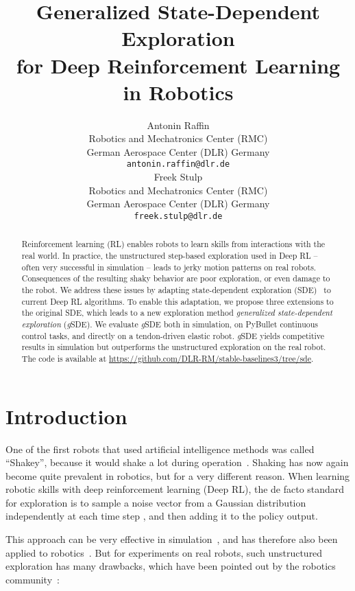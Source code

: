 \documentclass{article}
\title{\LARGE \textbf{Generalized State-Dependent Exploration\\for Deep Reinforcement Learning in Robotics}}
\author{
  Antonin Raffin\\
  Robotics and Mechatronics Center (RMC)\\
  German Aerospace Center (DLR)
  Germany\\
  \texttt{antonin.raffin@dlr.de} \\
  \And
  Freek Stulp\\
  Robotics and Mechatronics Center (RMC)\\
  German Aerospace Center (DLR)
  Germany\\
  \texttt{freek.stulp@dlr.de} \\
}
\newcommand{\ourSDE}{\textit{g}\textsc{SDE}\xspace}
\begin{document}
\maketitle


\begin{abstract}

Reinforcement learning (RL) enables robots to learn skills from interactions with the real world.
In practice, the unstructured step-based exploration used in Deep RL -- often very successful in simulation -- leads to jerky motion patterns on real robots. Consequences of the resulting shaky behavior are poor exploration, or even damage to the robot.
We address these issues by adapting state-dependent exploration (SDE)~\cite{ruckstiess2008state} to current Deep RL algorithms. To enable this adaptation, we propose three extensions to the original SDE, which leads to a new exploration method \textit{generalized state-dependent exploration} (\ourSDE).
We evaluate \ourSDE both in simulation, on PyBullet continuous control tasks, and directly on a tendon-driven elastic robot. \ourSDE yields competitive results in simulation but outperforms the unstructured exploration on the real robot.
The code is available at \url{https://github.com/DLR-RM/stable-baselines3/tree/sde}.

\end{abstract}

\section{Introduction}
\label{sec:intro}

One of the first robots that used artificial intelligence methods was called ``Shakey'', because it would shake a lot during operation~\cite{nilsson84shakey}.
Shaking has now again become quite prevalent in robotics, but for a very different reason. When learning robotic skills with deep reinforcement learning (Deep RL), the de facto standard for exploration is to sample a noise vector  from a Gaussian distribution independently at each time step , and then adding it to the policy output.



This approach can be very effective
in simulation~\citep{duan2016benchmarking,peng2018deepmimic, andrychowicz2018learning, fujimoto2018addressing, hwangbo2019learning}, and has therefore also been applied to robotics~\citep{haarnoja2018applications, kendall2019learning, zhu2020ingredients}.
But for experiments on real robots, such unstructured exploration has many drawbacks, which have been pointed out by the robotics community~\citep{ruckstiess2008state, kober2009policy, ruckstiess2010exploring, stulp2013robot, deisenroth2013survey}:
\end{document}
